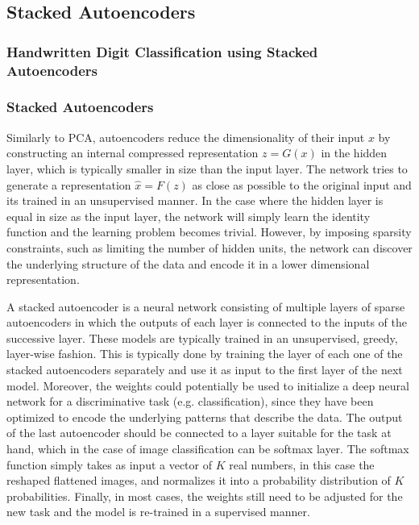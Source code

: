 \documentclass[conference,compsoc]{IEEEtran}
\begin{document}
\subsection{Stacked Autoencoders}


\subsubsection{Handwritten Digit Classification using Stacked Autoencoders}

\subsubsection{Stacked Autoencoders}
Similarly to PCA, autoencoders reduce the dimensionality of their input $x$ by constructing an internal compressed representation $z=G(x)$ in the hidden layer, which is typically smaller in size than the input layer. The network tries to generate a representation $\hat{x}=F(z)$ as close as possible to the original input and its trained in an unsupervised manner. In the case where the hidden layer is equal in size as the input layer, the network will simply learn the identity function and the learning problem becomes trivial. However, by imposing sparsity constraints, such as limiting the number of hidden units, the network can discover the underlying structure of the data and encode it in a lower dimensional representation.

A stacked autoencoder is a neural network consisting of multiple layers of sparse autoencoders in which the outputs of each layer is connected to the inputs of the successive layer. These models are typically trained in an unsupervised, greedy, layer-wise fashion. This is typically done by 
training the layer of each one of the stacked autoencoders separately and use it as input to the first layer of the next model. Moreover, the weights could potentially be used to initialize a deep neural network for a discriminative task (e.g. classification), since they have been optimized to encode the underlying patterns that describe the data. The output of the last autoencoder should be connected to a layer suitable for the task at hand, which in the case of image classification can be softmax layer. The softmax function simply takes as input a vector of $K$ real numbers, in this case the reshaped flattened images, and normalizes it into a probability distribution of $K$ probabilities. Finally, in most cases, the weights still need to be adjusted for the new task and the model is re-trained in a supervised manner.
\end{document}
